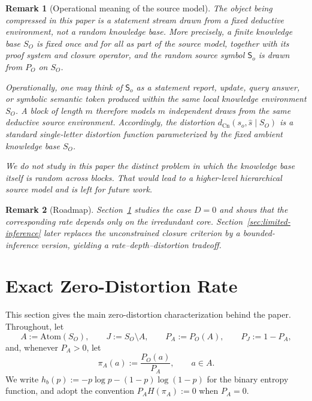 \documentclass[journal,onecolumn]{IEEEtran}
\newcommand{\Atom}{\text{Atom}}
\newcommand{\Cn}{\text{Cn}}
\newtheorem{remark}{Remark}[section]
\numberwithin{equation}{section}
\begin{document}
\begin{remark}[Operational meaning of the source model]
\label{rem:fixed-kb-parameter}
The object being compressed in this paper is a \emph{statement stream
drawn from a fixed deductive environment}, not a random knowledge base.
More precisely, a finite knowledge base \(S_O\) is fixed once and for
all as part of the source model, together with its proof system and
closure operator, and the random source symbol \({\mathsf{S}}_o\) is drawn from
\(P_O\) on \(S_O\).

Operationally, one may think of \({\mathsf{S}}_o\) as a statement report, update,
query answer, or symbolic semantic token produced within the same local
knowledge environment \(S_O\).
A block of length \(m\) therefore models \(m\) independent draws from
the same deductive source environment.
Accordingly, the distortion
\(d_{\Cn}(s_o,\hat s\mid S_O)\) is a standard single-letter
distortion function parameterized by the fixed ambient knowledge base
\(S_O\).

We do \emph{not} study in this paper the distinct problem in which the
knowledge base itself is random across blocks.
That would lead to a higher-level hierarchical source model and is left
for future work.
\end{remark}

\begin{remark}[Roadmap]
\label{rem:section2-roadmap}
Section~\ref{sec:exact-zero-rate} studies the case \(D=0\) and
shows that the corresponding rate depends only on the irredundant
core.
Section~\ref{sec:limited-inference} later replaces the
unconstrained closure criterion by a bounded-inference version,
yielding a rate--depth--distortion tradeoff.
\end{remark}

\section{Exact Zero-Distortion Rate}
\label{sec:exact-zero-rate}

This section gives the main zero-distortion characterization
behind the paper.
Throughout, let
\[
  A:=\Atom(S_O),
  \qquad
  J:=S_O\setminus A,
  \qquad
  P_A:=P_O(A),
  \qquad
  P_J:=1-P_A,
\]
and, whenever \(P_A>0\), let
\[
  \pi_A(a):=\frac{P_O(a)}{P_A},
  \qquad a\in A.
\]
We write \(h_b(p):=-p\log p-(1-p)\log(1-p)\) for the binary entropy function,
and adopt the convention \(P_A H(\pi_A):=0\) when \(P_A=0\).
\end{document}
